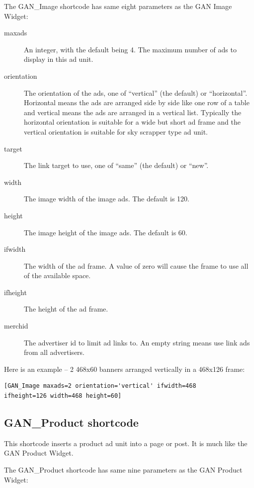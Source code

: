 \documentclass[letterpaper]{article}
\begin{document}
The GAN\_Image shortcode has same eight parameters as the GAN Image
Widget:
\begin{description}
  \item[maxads] An integer, with the default being 4.
The maximum number of ads to display in this ad unit.
  \item[orientation] The orientation of the ads, one of
``vertical'' (the default) or ``horizontal''. Horizontal means the ads are
arranged side by side like one row of a table and      vertical means
the ads are arranged in a vertical list. Typically the horizontal
orientation is suitable for a wide but short ad frame and the vertical
orientation is suitable for sky scrapper type ad unit.
  \item[target] The link target to use, one of ``same'' (the
default) or ``new''.
  \item[width] The image width of the image ads. The
default is 120.
  \item[height] The image height of the image ads. The
default is 60.
  \item[ifwidth] The width of the ad frame. A value
of zero will cause the frame to use all of the available space.
  \item[ifheight] The height of the ad frame.
  \item[merchid] The advertiser id to limit ad links to.  An empty string
means use link ads from all advertisers.
\end{description}

Here is an example -- 2 468x60 banners arranged vertically in a 468x126 frame:
\begin{verbatim}
[GAN_Image maxads=2 orientation='vertical' ifwidth=468 
ifheight=126 width=468 height=60]
\end{verbatim}

\subsection{GAN\_Product shortcode}

This shortcode inserts a product ad unit into a page or post. It is much
like the GAN Product Widget.

The GAN\_Product shortcode has same nine parameters as the GAN Product
Widget: 
\end{document}
